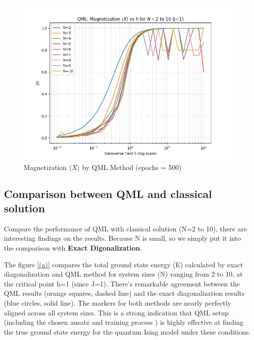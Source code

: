 \documentclass[pre,twocolumn,floatfix]{revtex4-1}
\begin{document}
\begin{figure}[H]
    \centering
    \includegraphics[width=0.5\linewidth]{images/magnetization_vs_h_multiprocess.png}
    \caption{Magnetization $\langle X \rangle$ by QML Method (epochs = 500)}
    \label{12}
\end{figure}

\subsection{Comparison between QML and classical solution}
Compare the performance of QML with classical solution (N=2 to 10), there are interesting findings on the results. Because N is small, so we simply put it into the comparison with \textbf{Exact Digonalization}.

The figure \ref{(a)} compares the total ground state energy (E) calculated by exact diagonalization and QML method for system sizes (N) ranging from 2 to 10, at the critical point h=1 (since J=1). There's remarkable agreement between the QML results (orange squares, dashed line) and the exact diagonalization results (blue circles, solid line). The markers for both methods are nearly perfectly aligned across all system sizes. This is a strong indication that QML setup (including the chosen ansatz and training process ) is highly effective at finding the true ground state energy for the quantum Ising model under these conditions. 
\end{document}
